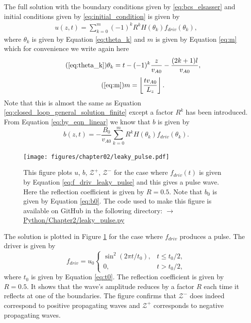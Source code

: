 The full solution with the boundary conditions given by \eqref{eq:bcs_elsasser} and initial conditions given by \eqref{eq:initial_condition} is given by
\begin{equation}
    \label{eq:leaky_loop_general_solution}
    \begin{aligned}
    u(z,t) = \sum_{k=0}^m(-1)^kR^kH(\theta_k)f_{driv}(\theta_k),
    \end{aligned}
\end{equation}
where $\theta_k$ is given by Equation \eqref{eq:theta_k} and $m$ is given by Equation \eqref{eq:m} which for convenience we write again here
\begin{equation}
    \tag{\ref{eq:theta_k}}
    \theta_k=t-(-1)^k\frac{z}{v_{A0}}-\frac{(2k+1)l}{v_{A0}},
\end{equation}
\begin{equation}
    \tag{\ref{eq:m}}
    m = \left\lfloor\frac{t v_{A0}}{L_z}\right\rfloor.
\end{equation}
Note that this is almost the same as Equation \eqref{eq:closed_loop_general_solution_finite} except a factor $R^k$ has been introduced. From Equation \eqref{eq:by_eqn_linear} we know that $b$ is given by
\begin{equation}
    b(z,t) = -\frac{B_0}{v_{A0}}\sum_{k=0}^mR^kH(\theta_k)f_{driv}(\theta_k).
\end{equation}

\begin{figure}
    \centering
    \vspace{-30pt}
    \texttt{[image: figures/chapter02/leaky\_pulse.pdf]}
    \vspace{-10pt}
    \caption{This figure plots $u$, $b$, $\mathcal{Z}^{+}$, $\mathcal{Z^{-}}$ for the case where $f_{driv}(t)$ is given by Equation \eqref{eq:f_driv_leaky_pulse} and this gives a pulse wave. Here the reflection coefficient is given by $R=0.5$. Note that $b_0$ is given by Equation \eqref{eq:b0}. The code used to make this figure is available on GitHub in the following directory:\newline
    \href{https://github.com/aleksyprok/apkp_thesis/blob/main/Python/Chapter2/leaky_pulse.py}{$\rightarrow$ Python/Chapter2/leaky\_pulse.py}}
    \vspace{-30pt}
    \label{fig:leaky_pulse}
\end{figure}

The solution is plotted in Figure \ref{fig:leaky_pulse} for the case where $f_{driv}$ produces a pulse. The driver is given by
\begin{equation}
    \label{eq:f_driv_leaky_pulse}
    f_{driv} = u_0\begin{cases}
    \sin^2(2\pi t / t_0), & t \le t_0 / 2,  \\
    0, & t > t_0 / 2,
    \end{cases}
\end{equation}
where $t_0$ is given by Equation \eqref{eq:t0}. The reflection coefficient is given by $R=0.5$. It shows that the wave's amplitude reduces by a factor $R$ each time it reflects at one of the boundaries. The figure confirms that $\mathcal{Z}^-$ does indeed correspond to positive propagating waves and $\mathcal{Z}^+$ corresponds to negative propagating waves.

